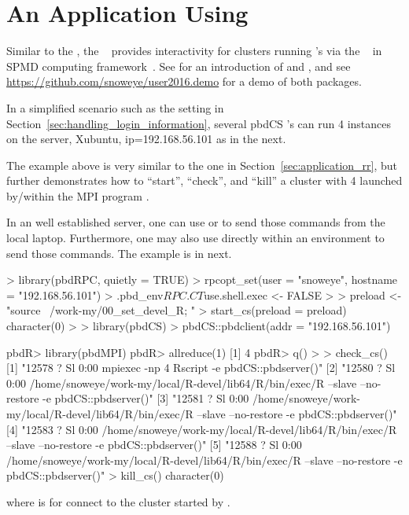 
\section[An Application Using \pkg{pbdCS}]{An Application Using }
\label{sec:application_cs}

Similar to the , the ~\citep{pbdCS} provides
interactivity for clusters running 's via the
~\citep{Chen2012pbdMPIpackage} in SPMD computing
framework~\citep{pbdR2012}.
See \citet{xsede16} for an introduction of  and , and
see \url{https://github.com/snoweye/user2016.demo}
for a demo of both packages.

In a simplified scenario such as the setting in
Section~\ref{sec:handling_login_information},
several pbdCS 's can run 4 instances on the server,
Xubuntu, ip=192.168.56.101 as in the next.
The example above is very similar to the one in
Section~\ref{sec:application_rr}, but further demonstrates
how to ``start'', ``check'', and ``kill''
a  cluster with 4  launched by/within
the MPI program .

In an well established server, one can use  or 
to send those commands from the local laptop.
Furthermore, one may also use  directly within an 
environment to send those commands. The example is in next.
\begin{Code}[title=Using \pkg{pbdRPC} to control \pkg{pbdCS}]
> library(pbdRPC, quietly = TRUE)
> rpcopt_set(user = "snoweye", hostname = "192.168.56.101")
> .pbd_env$RPC.CT$use.shell.exec <- FALSE
>
> preload <- "source ~/work-my/00_set_devel_R; "
> start_cs(preload = preload)
character(0)
>
> library(pbdCS)
> pbdCS::pbdclient(addr = "192.168.56.101")

pbdR> library(pbdMPI)
pbdR> allreduce(1)
[1] 4 
pbdR> q()
>
> check_cs()
[1] "12578 ?        Sl     0:00 mpiexec -np 4 Rscript -e pbdCS::pbdserver()"                                                      
[2] "12580 ?        Sl     0:00 /home/snoweye/work-my/local/R-devel/lib64/R/bin/exec/R --slave --no-restore -e pbdCS::pbdserver()"
[3] "12581 ?        Sl     0:00 /home/snoweye/work-my/local/R-devel/lib64/R/bin/exec/R --slave --no-restore -e pbdCS::pbdserver()"
[4] "12583 ?        Sl     0:00 /home/snoweye/work-my/local/R-devel/lib64/R/bin/exec/R --slave --no-restore -e pbdCS::pbdserver()"
[5] "12588 ?        Sl     0:00 /home/snoweye/work-my/local/R-devel/lib64/R/bin/exec/R --slave --no-restore -e pbdCS::pbdserver()"
> kill_cs()
character(0)
\end{Code}
where  is for connect to the  cluster
started by .

